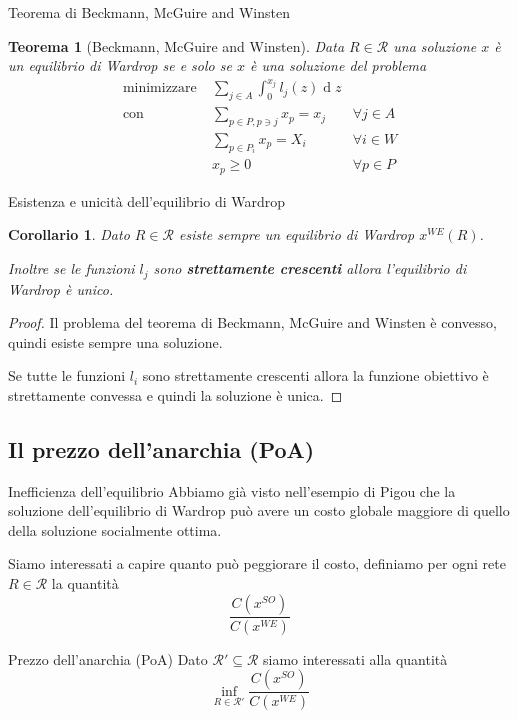 \documentclass{beamer}
\newcounter{counter1}
\theoremstyle{plain}
\newtheorem{myteo}[counter1]{Teorema}
\newtheorem{mycor}[counter1]{Corollario}
\theoremstyle{definition}
\theoremstyle{remark}
\newcommand{\pa}[1]{\left(#1\right)}
\DeclareMathOperator{\de}{d}
\begin{document}
\begin{frame}{Teorema di Beckmann, McGuire and Winsten}
  \begin{myteo}[Beckmann, McGuire and Winsten]
    Data $R\in \mathcal{R}$ una soluzione $x$ è un equilibrio di
    Wardrop se e solo se $x$ è una soluzione del problema
    \begin{align*}
        \text{minimizzare} \;&  \sum _{j\in A} \int _0 ^ {x_j}
        l_j(z)\de z \\
        \text{con} \;& \sum _{p\in P, p\ni j} x_p = x_j&\forall j\in
        A\\
        & \sum _{p\in P_i} x_p = X_i& \forall i\in W\\
        & x_p \ge 0&\forall p\in P        
    \end{align*}
  \end{myteo}
\end{frame}


\begin{frame}{Esistenza e unicità dell'equilibrio di Wardrop}
  \begin{mycor}
    Dato $R\in \mathcal{R}$ esiste sempre un equilibrio di Wardrop
    $x^{WE}(R)$.

    Inoltre se le funzioni $l_j$ sono \textbf{strettamente crescenti}
    allora l'equilibrio di Wardrop è unico.
  \end{mycor}
  \begin{proof}
    Il problema del teorema di Beckmann, McGuire and Winsten è
    convesso, quindi esiste sempre una soluzione.

    Se tutte le funzioni $l_i$ sono strettamente crescenti allora la
    funzione obiettivo è strettamente convessa e quindi la soluzione è
    unica.
  \end{proof}
\end{frame}

\subsection{Il prezzo dell'anarchia (PoA)}

\begin{frame}{Inefficienza dell'equilibrio}
  Abbiamo già visto nell'esempio di Pigou che la soluzione
  dell'equilibrio di Wardrop può avere un costo globale maggiore di
  quello della soluzione socialmente ottima.

  Siamo interessati a capire quanto può peggiorare il costo, definiamo
  per ogni rete $R \in \mathcal{R}$ la quantità
  \[ \frac{C\pa{ x^{SO}}}{C\pa{ x^{WE}}} \]
  \begin{block}{Prezzo dell'anarchia (PoA)}
    Dato $\mathcal{R}' \subseteq \mathcal{R}$ siamo interessati alla
    quantità
    \[ \inf _{R\in \mathcal{R}'} \frac{C\pa{ x^{SO}}}{C\pa{
          x^{WE}}} \]
  \end{block}
\end{frame}
\end{document}
